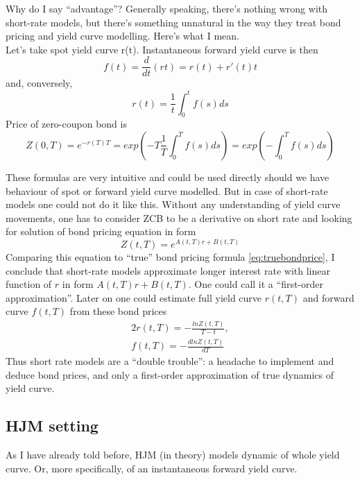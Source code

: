 \documentclass[11pt]{article} %
\begin{document}
Why do I say ``advantage''? Generally speaking, there's nothing wrong with short-rate models, but there's something unnatural in the way they treat bond pricing and yield curve modelling. Here's what I mean.\\
Let's take spot yield curve r(t). Instantaneous forward yield curve is then 
\begin{equation}
f(t) = \frac{d}{dt}(rt) = r(t) + r'(t) t
\end{equation}
and, conversely, 
\begin{equation}
r(t) = \frac{1}{t}\int_{0}^{t}{f(s)ds}
\end{equation}
Price of zero-coupon bond is
\begin{equation} \label{eq:truebondprice}
Z(0,T) = e^{-r(T)T} = exp\left(-T\frac{1}{T}\int_{0}^{T}{f(s)ds}\right) = exp\left(-\int_{0}^{T}{f(s)ds}\right)
\end{equation}

These formulas are very intuitive and could be used directly should we have behaviour of spot or forward yield curve modelled. But in case of short-rate models one could not do it like this. Without any understanding of yield curve movements, one has to consider ZCB to be a derivative on short rate and looking for solution of bond pricing equation in form 
\begin{equation} 
Z(t,T) = e^{A(t,T) r + B(t,T)}
\end{equation}
Comparing this equation to ``true'' bond pricing formula \eqref{eq:truebondprice}, I conclude that short-rate models approximate longer interest rate with linear function of $r$ in form $A(t,T) r + B(t,T)$. One could call it a ``first-order approximation''. Later on one could estimate full yield curve $r(t,T)$ and forward curve $f(t,T)$ from these bond prices
\begin{alignat}{2}
r(t,T) = -\frac{ln Z(t,T)}{T-t},\\
\label{eq:fwdfrombond} f(t,T) = -\frac{d lnZ(t,T)}{dT}
\end{alignat}
Thus short rate models are a ``double trouble'': a headache to implement and deduce bond prices, and only a first-order approximation of true dynamics of yield curve.\\

\subsection{HJM setting}

As I have already told before, HJM (in theory) models dynamic of whole yield curve. Or, more specifically, of an instantaneous forward yield curve.\\
\end{document}
